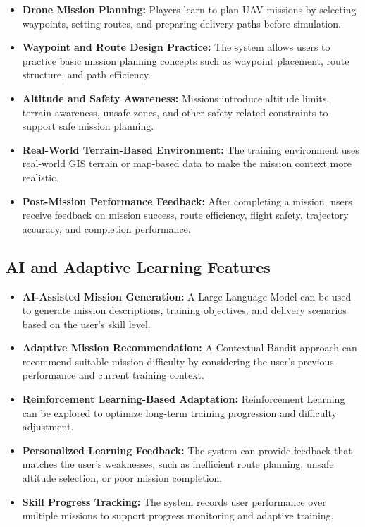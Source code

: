 \begin{itemize}
    \item \textbf{Drone Mission Planning:} Players learn to plan UAV missions by selecting waypoints, setting routes, and preparing delivery paths before simulation.
    \item \textbf{Waypoint and Route Design Practice:} The system allows users to practice basic mission planning concepts such as waypoint placement, route structure, and path efficiency.
    \item \textbf{Altitude and Safety Awareness:} Missions introduce altitude limits, terrain awareness, unsafe zones, and other safety-related constraints to support safe mission planning.
    \item \textbf{Real-World Terrain-Based Environment:} The training environment uses real-world GIS terrain or map-based data to make the mission context more realistic.
    \item \textbf{Post-Mission Performance Feedback:} After completing a mission, users receive feedback on mission success, route efficiency, flight safety, trajectory accuracy, and completion performance.
\end{itemize}


\subsection{AI and Adaptive Learning Features}
\label{subsection:AI and Adaptive Learning Features}

\begin{itemize}
    \item \textbf{AI-Assisted Mission Generation:} A Large Language Model can be used to generate mission descriptions, training objectives, and delivery scenarios based on the user's skill level.
    \item \textbf{Adaptive Mission Recommendation:} A Contextual Bandit approach can recommend suitable mission difficulty by considering the user's previous performance and current training context.
    \item \textbf{Reinforcement Learning-Based Adaptation:} Reinforcement Learning can be explored to optimize long-term training progression and difficulty adjustment.
    \item \textbf{Personalized Learning Feedback:} The system can provide feedback that matches the user's weaknesses, such as inefficient route planning, unsafe altitude selection, or poor mission completion.
    \item \textbf{Skill Progress Tracking:} The system records user performance over multiple missions to support progress monitoring and adaptive training.
\end{itemize}


